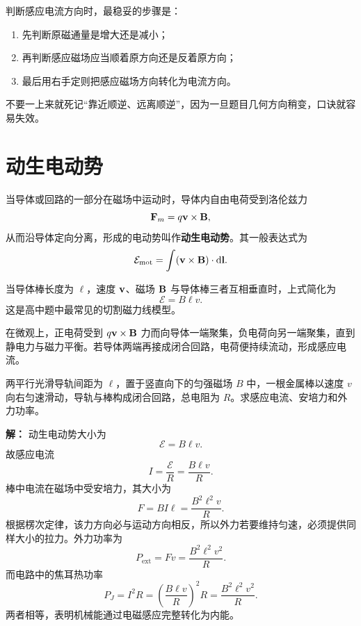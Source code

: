 \begin{remark}
判断感应电流方向时，最稳妥的步骤是：
\begin{enumerate}
  \item 先判断原磁通量是增大还是减小；
  \item 再判断感应磁场应当顺着原方向还是反着原方向；
  \item 最后用右手定则把感应磁场方向转化为电流方向。
\end{enumerate}
不要一上来就死记“靠近顺逆、远离顺逆”，因为一旦题目几何方向稍变，口诀就容易失效。
\end{remark}

\section{动生电动势}

\begin{definition}
当导体或回路的一部分在磁场中运动时，导体内自由电荷受到洛伦兹力
\[
\vb{F}_m=q\vb{v}\times\vb{B},
\]
从而沿导体定向分离，形成的电动势叫作\textbf{动生电动势}。其一般表达式为
\[
\mathcal{E}_{\text{mot}}=\int (\vb{v}\times\vb{B})\cdot \dd \vb{l}.
\]
\end{definition}

当导体棒长度为 $\ell$，速度 $\vb{v}$、磁场 $\vb{B}$ 与导体棒三者互相垂直时，上式简化为
\[
\mathcal{E}=B\ell v.
\]
这是高中题中最常见的切割磁力线模型。

\begin{center}
\end{center}

在微观上，正电荷受到 $q\vb{v}\times\vb{B}$ 力而向导体一端聚集，负电荷向另一端聚集，直到静电力与磁力平衡。若导体两端再接成闭合回路，电荷便持续流动，形成感应电流。

\begin{example}
两平行光滑导轨间距为 $\ell$，置于竖直向下的匀强磁场 $B$ 中，一根金属棒以速度 $v$ 向右匀速滑动，导轨与棒构成闭合回路，总电阻为 $R$。求感应电流、安培力和外力功率。

\textbf{解：} 动生电动势大小为
\[
\mathcal{E}=B\ell v.
\]
故感应电流
\[
I=\frac{\mathcal{E}}{R}=\frac{B\ell v}{R}.
\]
棒中电流在磁场中受安培力，其大小为
\[
F=B I \ell=\frac{B^2\ell^2 v}{R}.
\]
根据楞次定律，该力方向必与运动方向相反，所以外力若要维持匀速，必须提供同样大小的拉力。外力功率为
\[
P_{\text{ext}}=Fv=\frac{B^2\ell^2 v^2}{R}.
\]
而电路中的焦耳热功率
\[
P_J=I^2R=\left(\frac{B\ell v}{R}\right)^2R=\frac{B^2\ell^2 v^2}{R}.
\]
两者相等，表明机械能通过电磁感应完整转化为内能。
\end{example}

